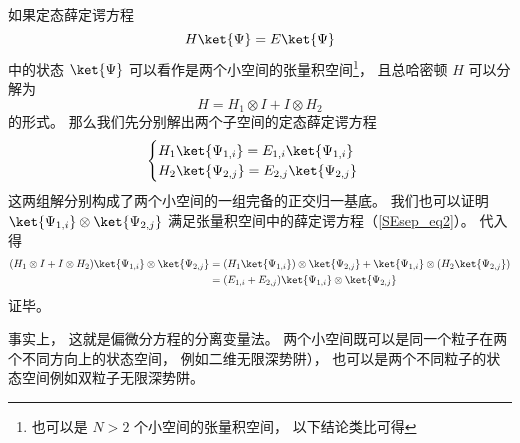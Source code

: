 
如果定态薛定谔方程
\begin{equation}\label{SEsep_eq2}
H \ket{\Psi} = E \ket{\Psi}
\end{equation}
中的状态 $\ket{\Psi}$ 可以看作是两个小空间的张量积空间\footnote{也可以是 $N > 2$ 个小空间的张量积空间， 以下结论类比可得}， 且总哈密顿 $H$ 可以分解为
\begin{equation}\label{SEsep_eq1}
H = H_1 \otimes I + I \otimes H_2
\end{equation}
的形式。 那么我们先分别解出两个子空间的定态薛定谔方程
\begin{equation}
\begin{cases}
H_1 \ket{\Psi_{1,i}} = E_{1,i} \ket{\Psi_{1,i}}\\
H_2 \ket{\Psi_{2,j}} = E_{2,j} \ket{\Psi_{2,j}}
\end{cases}
\end{equation}
这两组解分别构成了两个小空间的一组完备的正交归一基底。 我们也可以证明 $\ket{\Psi_{1,i}} \otimes \ket{\Psi_{2,j}}$ 满足张量积空间中的薛定谔方程（\autoref{SEsep_eq2}）。 代入得
\begin{equation}
\begin{aligned}
(H_1 \otimes I + I \otimes H_2) \ket{\Psi_{1,i}} \otimes \ket{\Psi_{2,j}} &= (H_1 \ket{\Psi_{1,i}}) \otimes \ket{\Psi_{2,j}} +  \ket{\Psi_{1,i}} \otimes (H_2 \ket{\Psi_{2,j}})\\
&= (E_{1,i} + E_{2, j}) \ket{\Psi_{1,i}} \otimes \ket{\Psi_{2,j}}
\end{aligned}
\end{equation}
证毕。

事实上， 这就是偏微分方程的分离变量法。 两个小空间既可以是同一个粒子在两个不同方向上的状态空间， 例如二维无限深势阱）， 也可以是两个不同粒子的状态空间例如双粒子无限深势阱。%
